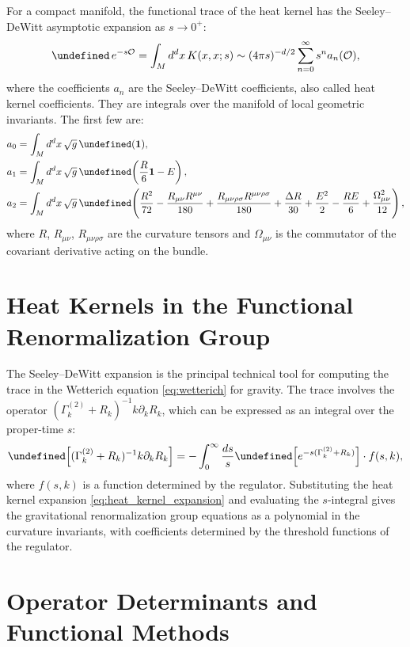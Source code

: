 \documentclass[11pt, twoside, openright]{book}
\theoremstyle{dotted}
\theoremstyle{definition}
\newcommand{\Gktwo}{\Gamma_k^{(2)}}   %
\newcommand{\Rk}{R_k}                  %
\newcommand{\kdk}{k\partial_k}         %
\let\tr\undefined
\DeclareMathOperator{\tr}{Tr}          %
\begin{document}
For a compact manifold, the functional trace of the heat kernel has the
Seeley--DeWitt asymptotic expansion as $s \to 0^+$:
\begin{equation}
  \tr\, e^{-s\mathcal{O}} = \int_M d^dx\, K(x,x;s)
  \sim (4\pi s)^{-d/2}\sum_{n=0}^\infty s^n a_n(\mathcal{O}),
  \label{eq:heat_kernel_expansion}
\end{equation}
where the coefficients $a_n$ are the Seeley--DeWitt coefficients, also called
heat kernel coefficients. They are integrals over the manifold of local geometric
invariants. The first few are:
\begin{align}
  a_0 &= \int_M d^dx\,\sqrt{g}\,\tr(\mathbf{1}), \\
  a_1 &= \int_M d^dx\,\sqrt{g}\,\tr\!\left(\frac{R}{6}\mathbf{1} - E\right), \\
  a_2 &= \int_M d^dx\,\sqrt{g}\,\tr\!\left(
    \frac{R^2}{72} - \frac{R_{\mu\nu}R^{\mu\nu}}{180} + \frac{R_{\mu\nu\rho\sigma}R^{\mu\nu\rho\sigma}}{180}
    + \frac{\Delta R}{30} + \frac{E^2}{2} - \frac{RE}{6} + \frac{\Omega_{\mu\nu}^2}{12}
  \right),
  \label{eq:seeley_dewitt}
\end{align}
where $R$, $R_{\mu\nu}$, $R_{\mu\nu\rho\sigma}$ are the curvature tensors and
$\Omega_{\mu\nu}$ is the commutator of the covariant derivative acting on the
bundle.

\section{Heat Kernels in the Functional Renormalization Group}

The Seeley--DeWitt expansion is the principal technical tool for computing the
trace in the Wetterich equation \eqref{eq:wetterich} for gravity. The trace
involves the operator $(\Gktwo + \Rk)^{-1}\kdk\Rk$, which can be expressed as
an integral over the proper-time $s$:
\begin{equation}
  \tr\!\left[(\Gktwo + \Rk)^{-1}\kdk\Rk\right]
  = -\int_0^\infty \frac{ds}{s}\tr\!\left[e^{-s(\Gktwo+\Rk)}\right] \cdot f(s,k),
  \label{eq:proper_time}
\end{equation}
where $f(s,k)$ is a function determined by the regulator. Substituting the
heat kernel expansion \eqref{eq:heat_kernel_expansion} and evaluating the
$s$-integral gives the gravitational renormalization group equations as a polynomial
in the curvature invariants, with coefficients determined by the threshold functions
of the regulator.

\section{Operator Determinants and Functional Methods}
\end{document}
